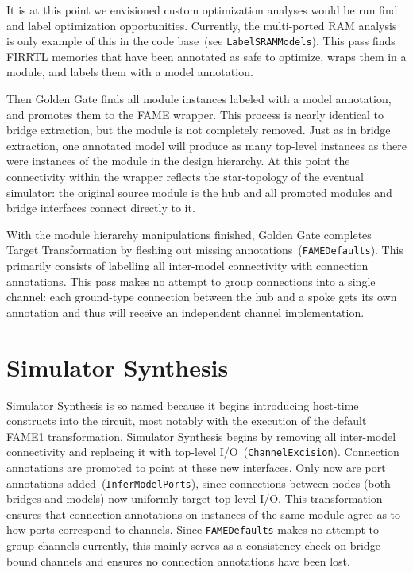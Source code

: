 It is at this point we envisioned custom optimization analyses would be run
find and label optimization opportunities. Currently, the multi-ported RAM
analysis is only example of this in the code base~(see
\texttt{LabelSRAMModels}).  This pass finds FIRRTL memories that have been
annotated as safe to optimize, wraps them in a module, and labels them with a
model annotation.

Then Golden Gate finds all module instances labeled with a model annotation, and
promotes them to the FAME wrapper. This process is nearly identical
to bridge extraction, but the module is not completely removed. Just as in
bridge extraction, one annotated model will produce as many top-level instances
as there were instances of the module in the design hierarchy.  At this point
the connectivity within the wrapper reflects the star-topology of the eventual
simulator: the original source module is the hub and all promoted modules and
bridge interfaces connect directly to it.

With the module hierarchy manipulations finished, Golden Gate completes Target
Transformation by fleshing out missing annotations~(\texttt{FAMEDefaults}). This primarily consists of labelling
all inter-model connectivity with connection annotations. This pass makes no
attempt to group connections into a single channel: each ground-type
connection between the hub and a spoke gets its own annotation and thus will receive an independent channel implementation.

\section{Simulator Synthesis}

Simulator Synthesis is so named because it begins introducing host-time constructs into the circuit,
most notably with the execution of the default FAME1 transformation. Simulator
Synthesis begins by removing all inter-model connectivity and replacing it
with top-level I/O~(\texttt{ChannelExcision}). Connection annotations are
promoted to point at these new interfaces. Only now are port annotations
added~(\texttt{InferModelPorts}), since connections between nodes (both bridges and models)
now uniformly target top-level I/O.  This transformation
ensures that connection annotations on instances of the same module agree as to how
ports correspond to channels. Since \texttt{FAMEDefaults} makes no attempt to
group channels currently, this mainly serves as a consistency check on
bridge-bound channels and ensures no connection annotations have been lost.

